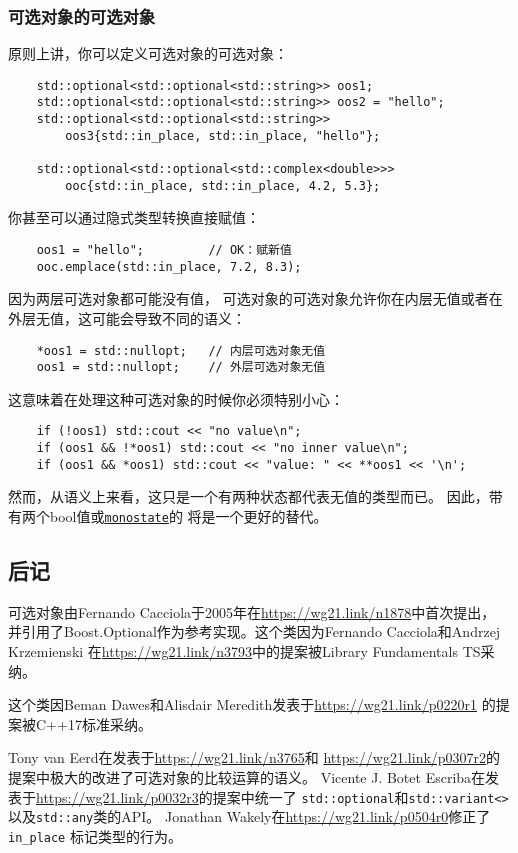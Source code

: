 \subsubsection{可选对象的可选对象}
原则上讲，你可以定义可选对象的可选对象：
\begin{lstlisting}
    std::optional<std::optional<std::string>> oos1;
    std::optional<std::optional<std::string>> oos2 = "hello";
    std::optional<std::optional<std::string>>
        oos3{std::in_place, std::in_place, "hello"};

    std::optional<std::optional<std::complex<double>>>
        ooc{std::in_place, std::in_place, 4.2, 5.3};
\end{lstlisting}
你甚至可以通过隐式类型转换直接赋值：
\begin{lstlisting}
    oos1 = "hello";         // OK：赋新值
    ooc.emplace(std::in_place, 7.2, 8.3);
\end{lstlisting}
因为两层可选对象都可能没有值，
可选对象的可选对象允许你在内层无值或者在外层无值，这可能会导致不同的语义：
\begin{lstlisting}
    *oos1 = std::nullopt;   // 内层可选对象无值
    oos1 = std::nullopt;    // 外层可选对象无值
\end{lstlisting}
这意味着在处理这种可选对象的时候你必须特别小心：
\begin{lstlisting}
    if (!oos1) std::cout << "no value\n";
    if (oos1 && !*oos1) std::cout << "no inner value\n";
    if (oos1 && *oos1) std::cout << "value: " << **oos1 << '\n';
\end{lstlisting}
然而，从语义上来看，这只是一个有两种状态都代表无值的类型而已。
因此，带有两个bool值或\hyperref[ch16.2.1]{\texttt{monostate}}的
将是一个更好的替代。

\subsection{后记}
可选对象由Fernando Cacciola于2005年在\url{https://wg21.link/n1878}中首次提出，
并引用了Boost.Optional作为参考实现。这个类因为Fernando Cacciola和Andrzej Krzemienski
在\url{https://wg21.link/n3793}中的提案被Library Fundamentals TS采纳。

这个类因Beman Dawes和Alisdair Meredith发表于\url{https://wg21.link/p0220r1}
的提案被C++17标准采纳。

Tony van Eerd在发表于\url{https://wg21.link/n3765}和
\url{https://wg21.link/p0307r2}的提案中极大的改进了可选对象的比较运算的语义。
Vicente J. Botet Escriba在发表于\url{https://wg21.link/p0032r3}的提案中统一了
\texttt{std::optional}和\texttt{std::variant<>}以及\texttt{std::any}类的API。
Jonathan Wakely在\url{https://wg21.link/p0504r0}修正了\texttt{in\_place}
标记类型的行为。